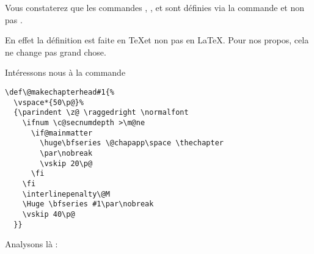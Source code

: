 \begin{anedocte}
Vous constaterez que les commandes , ,  et  sont définies via la commande  et non pas . 

En effet la définition est faite en \TeX et non pas en \LaTeX. Pour nos propos, cela ne change pas grand chose.
\end{anedocte} 

Intéressons nous à la commande  

\begin{verbatim}
\def\@makechapterhead#1{%
  \vspace*{50\p@}%
  {\parindent \z@ \raggedright \normalfont
    \ifnum \c@secnumdepth >\m@ne
      \if@mainmatter
        \huge\bfseries \@chapapp\space \thechapter
        \par\nobreak
        \vskip 20\p@
      \fi
    \fi
    \interlinepenalty\@M
    \Huge \bfseries #1\par\nobreak
    \vskip 40\p@
  }}
\end{verbatim}

Analysons là :

